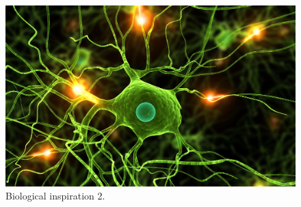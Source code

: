 \begin{figure}[!htb]
\centering
\includegraphics[width=.80\columnwidth]{images/049neuron1}
\caption[Biological inspiration 2]{Biological inspiration 2.}
\label{fig:049neuron1}
\end{figure}